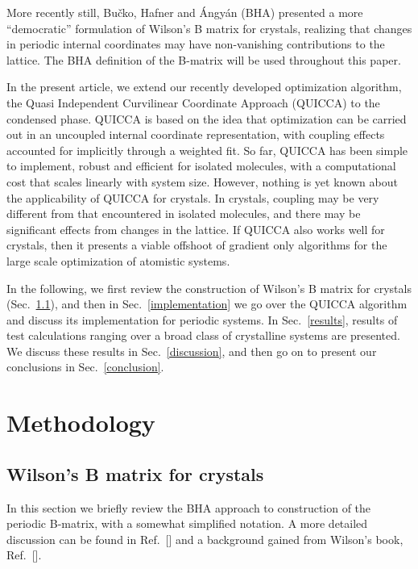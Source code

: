 \twolinestyle{\documentclass[prb,preprint]{revtex4}}
\begin{document}
More recently still, Bu\v{c}ko, Hafner and {\'A}ngy{\'a}n (BHA) \cite{TBucko05}
presented a more ``democratic'' formulation of Wilson's B matrix for crystals, 
realizing that changes in periodic internal coordinates may have non-vanishing 
contributions to the lattice.  The BHA definition of the B-matrix will be used 
throughout this paper. 

In the present article, we extend our recently developed optimization algorithm, 
the Quasi Independent Curvilinear Coordinate Approach (QUICCA) \cite{KNemeth04} 
to the condensed phase.  QUICCA is based on the idea  that optimization 
can be carried out in an uncoupled internal coordinate representation, with coupling 
effects accounted for implicitly through a weighted fit. So far,
QUICCA has been simple to implement, robust and efficient for isolated 
molecules, with a computational cost that scales linearly with system size.
However, nothing is yet known about the applicability of QUICCA for crystals. 
In crystals, coupling  may be very different from that encountered in isolated 
molecules, and there may be significant effects from changes in the lattice.
If QUICCA also works well for crystals, then it presents a viable offshoot 
of gradient only algorithms for the large scale optimization of atomistic 
systems. 

In the following, we first review the construction of Wilson's B matrix
for crystals (Sec.~\ref{crystalBmat}), and then in Sec.~\ref{implementation}
we go over the QUICCA algorithm  and discuss its implementation for 
periodic systems.  In Sec.~\ref{results}, results of test calculations 
ranging over a broad class of crystalline systems are presented.
We discuss these results in Sec.~\ref{discussion}, and then go on to 
present our conclusions in Sec.~\ref{conclusion}.

\section{Methodology}

\subsection{Wilson's B matrix for crystals} \label{crystalBmat}

In this section we briefly review the BHA approach to construction
of the periodic B-matrix, with a somewhat simplified notation.  
A more detailed discussion can be found in Ref.~[] 
and a background gained from Wilson's book, Ref.~[].
\end{document}
